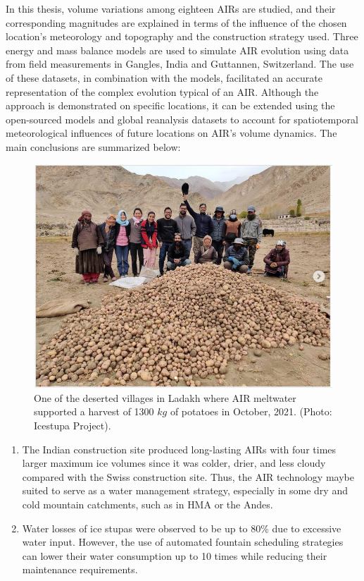 In this thesis, volume variations among eighteen \ac{AIRs} are studied, and their corresponding magnitudes
are explained in terms of the influence of the chosen location's meteorology and topography and the construction
strategy used. Three energy and mass balance models are used to simulate \ac{AIR} evolution using data from field
measurements in Gangles, India and Guttannen, Switzerland. The use of these datasets, in combination with the
models, facilitated an accurate representation of the complex evolution typical of an \ac{AIR}. Although the
approach is demonstrated on specific locations, it can be extended using the open-sourced models and global
reanalysis datasets to account for spatiotemporal meteorological influences of future locations on \ac{AIR}'s
volume dynamics. The main conclusions are summarized below:

\begin{figure}[htb]
  \centering
	\includegraphics[width=8 cm]{figs/Kullum_potatoes}
	\caption{One of the deserted villages in Ladakh where \ac{AIR} meltwater supported a harvest of 1300 $kg$ of
		potatoes in October, 2021. (Photo: Icestupa Project).}
	\label{fig:kullum_potatoes}
\end{figure}

\begin{enumerate}

  \item The Indian construction site produced long-lasting \ac{AIRs} with four times larger maximum ice volumes
    since it was colder, drier, and less cloudy compared with the Swiss construction site. Thus, the \ac{AIR}
    technology maybe suited to serve as a water management strategy, especially in some dry and cold mountain
    catchments, such as in \ac{HMA} or the Andes.

  \item Water losses of ice stupas were observed to be up to 80\% due to excessive water input. However, the use
    of automated fountain scheduling strategies can lower their water consumption up to 10 times while reducing
    their maintenance requirements.

\end{enumerate}

